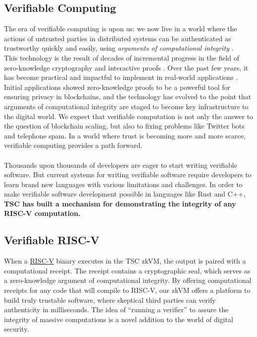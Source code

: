 \documentclass[10pt,letterpaper,titlepage]{article}
\theoremstyle{definition}
\begin{document}
\subsection{Verifiable Computing}
The era of verifiable computing is upon us: we now live in a world where the actions of untrusted parties in distributed systems can be authenticated as trustworthy quickly and easily, using \textit{arguments of computational integrity} \cite{stark}. \\
This technology is the result of decades of incremental progress in the field of zero-knowledge cryptography and interactive proofs \cite{zkp,pcp,iop}. 
Over the past few years, it has become practical and impactful to implement in real-world applications \cite{zcash,ethSTARK}. 
Initial applications showed zero-knowledge proofs to be a powerful tool for ensuring privacy in blockchains, and the technology has evolved to the point that arguments of computational integrity are staged to become key infrastructure to the digital world.
We expect that verifiable computation is not only the answer to the question of blockchain scaling, but also to fixing problems like Twitter bots and telephone spam. 
In a world where trust is becoming more and more scarce, verifiable computing provides a path forward. \\
\\
Thousands upon thousands of developers are eager to start writing verifiable software.
But current systems for writing verifiable software require developers to learn brand new languages with various limitations and challenges. 
In order to make verifiable software development possible in languages like Rust and C++, \textbf{TSC has built a mechanism for demonstrating the integrity of any RISC-V computation.} 

\subsection{Verifiable RISC-V}
When a \href{https://riscv.org/} {RISC-V} binary executes in the TSC zkVM, the output is paired with a computational receipt.
The receipt contains a cryptographic seal, which serves as a zero-knowledge argument of computational integrity. 
By offering computational receipts for any code that will compile to RISC-V, our zkVM offers a platform to build truly trustable software, where skeptical third parties can verify authenticity in milliseconds. The idea of ``running a verifier'' to assure the integrity of massive computations is a novel addition to the world of digital security.
\end{document}
